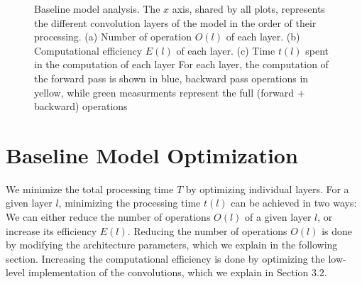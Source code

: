 \documentclass[runningheads]{llncs}
\begin{document}
\begin{figure}[h]
\centering
{}%
%
%
\centering
\caption{
Baseline model analysis. 
The $x$ axis, shared by all plots, represents the different convolution layers of the model in the order of their processing. 
(a) Number of operation $O(l)$ of each layer. 
(b) Computational efficiency $E(l)$ of each layer.
(c) Time $t(l)$ spent in the computation of each layer
For each layer, the computation of the forward pass is shown in blue, 
backward pass operations in yellow, 
while green measurments represent the full (forward + backward) operations
}
\end{figure}

\section{Baseline Model Optimization}

We minimize the total processing time $T$ by optimizing individual layers.
For a given layer $l$, minimizing the processing time $ t(l) $ can be achieved in two ways:
We can either reduce the number of operations $O(l)$ of a given layer $l$, or increase its efficiency $E(l)$.
Reducing the number of operations $O(l)$ is done by modifying the architecture parameters, which we explain in the following section.
Increasing the computational efficiency is done by optimizing the low-level implementation of the convolutions, which we explain in Section 3.2.
\end{document}
